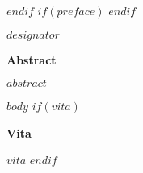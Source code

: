 \documentclass[12pt,letterpaper,toc=flat,oneside]{book}
\begin{document}
 \def\ackhead{\chapter*{Acknowledgements}
  \addcontentsline{toc}{chapter}{Acknowledgements}
  \addtocontents{toc}{\protect\addvspace{10\p@}}
 }
 \def\acktail{\par \null\vspace*{.75in}\hspace*{3in} \@author \newpage} 
$endif$
$if(preface)$
\newenvironment{preface}{
\chapter*{Preface}     
\addcontentsline{toc}{chapter}{Preface}
\addtocontents{toc}{\protect\addvspace{10\p@}}
}{}
$endif$
    \thispagestyle{plain}
    \noindent $designator$
    \begin{center}
	\large\bfseries Abstract
    \end{center}
    \vspace{2em}
    $abstract$
\renewcommand\contentsname{\hfill \bfseries\large Table of Contents\hfill}
\tableofcontents
\newpage
\renewcommand\listtablename{\hfill \bfseries\large List of Tables\hfill}
\listoftables
\newpage
\renewcommand\listfigurename{\hfill \bfseries\large List of Figures\hfill}
\listoffigures
\newpage
$body$
\newpage
$if(vita)$
    \newpage
    \begin{center}
	\large\bfseries Vita
    \end{center}
    \vspace{2em}
    $vita$
    \newpage
$endif$
 
\end{document}
